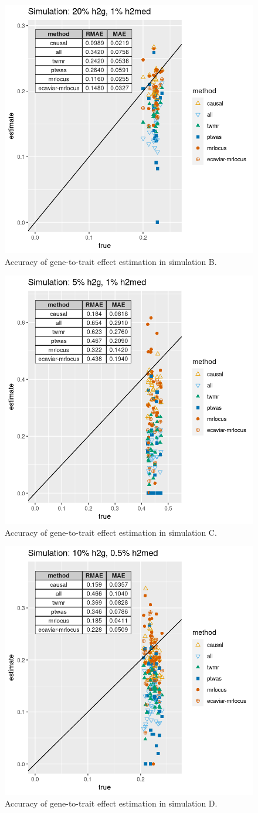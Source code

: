 \documentclass[11pt]{article}
\begin{document}
\begin{figure}[!ht]
  \centering
  \includegraphics[width=.6\textwidth]{figs/sim3.png}
  \caption{Accuracy of gene-to-trait effect estimation in simulation B.}
\end{figure}

\begin{figure}[!ht]
  \centering
  \includegraphics[width=.6\textwidth]{figs/sim2.png}
  \caption{Accuracy of gene-to-trait effect estimation in simulation C.}
\end{figure}

\begin{figure}[!ht]
  \centering
  \includegraphics[width=.6\textwidth]{figs/sim4.png}
  \caption{Accuracy of gene-to-trait effect estimation in simulation D.}
\end{figure}
\end{document}
